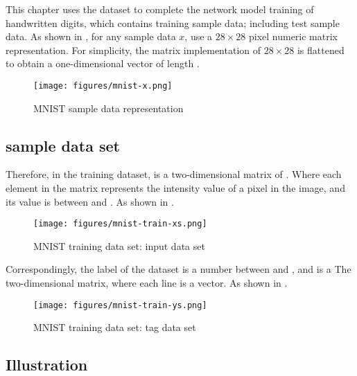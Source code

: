 \begin{content}

This chapter uses the  dataset to complete the network model training of handwritten digits, which contains  training sample data; including  test sample data. As shown in , for any sample data $x$, use a $28 \times 28$ pixel numeric matrix representation. For simplicity, the matrix implementation of $28 \times 28$ is flattened to obtain a one-dimensional vector of length .

\begin{figure}[H]
\centering
\texttt{[image: figures/mnist-x.png]}
\caption{MNIST sample data representation}
 \label{fig:mnist-x}
\end{figure}

\subsection{sample data set}

Therefore, in the  training dataset,  is a two-dimensional matrix of \code{[60000, 784]}. Where each element in the matrix represents the intensity value of a pixel in the image, and its value is between  and . As shown in .

\begin{figure}[H]
\centering
\texttt{[image: figures/mnist-train-xs.png]}
\caption{MNIST training data set: input data set}
 \label{fig:mnist-train-xs}
\end{figure}

Correspondingly, the label of the  dataset is a number between  and , and  is a \code{[60000, 10]} The two-dimensional matrix, where each line is a  vector. As shown in .

\begin{figure}[H]
\centering
\texttt{[image: figures/mnist-train-ys.png]}
\caption{MNIST training data set: tag data set}
 \label{fig:mnist-train-ys}
\end{figure}

\subsection{Illustration}

\begin{content}


\end{content}
\end{content}
